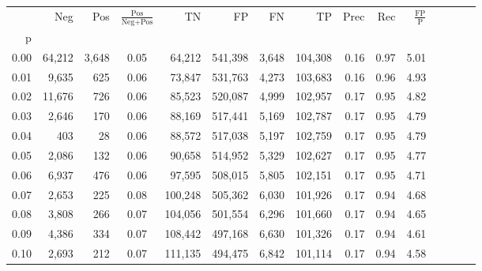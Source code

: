\begin{tabular}{rrrcrrrrrrrrrrr}
\toprule
{} &     Neg &     Pos & $\frac{\text{Pos}}{\text{Neg}+\text{Pos}}$ &       TN &       FP &       FN &       TP &  Prec &   Rec & $\frac{\text{FP}}{\text{P}}$ \\
p    &         &         &                                            &          &          &          &          &       &       &                              \\
\midrule
0.00 &  64,212 &   3,648 &                                       0.05 &   64,212 &  541,398 &    3,648 &  104,308 &  0.16 &  0.97 &                         5.01 \\
0.01 &   9,635 &     625 &                                       0.06 &   73,847 &  531,763 &    4,273 &  103,683 &  0.16 &  0.96 &                         4.93 \\
0.02 &  11,676 &     726 &                                       0.06 &   85,523 &  520,087 &    4,999 &  102,957 &  0.17 &  0.95 &                         4.82 \\
0.03 &   2,646 &     170 &                                       0.06 &   88,169 &  517,441 &    5,169 &  102,787 &  0.17 &  0.95 &                         4.79 \\
0.04 &     403 &      28 &                                       0.06 &   88,572 &  517,038 &    5,197 &  102,759 &  0.17 &  0.95 &                         4.79 \\
0.05 &   2,086 &     132 &                                       0.06 &   90,658 &  514,952 &    5,329 &  102,627 &  0.17 &  0.95 &                         4.77 \\
0.06 &   6,937 &     476 &                                       0.06 &   97,595 &  508,015 &    5,805 &  102,151 &  0.17 &  0.95 &                         4.71 \\
0.07 &   2,653 &     225 &                                       0.08 &  100,248 &  505,362 &    6,030 &  101,926 &  0.17 &  0.94 &                         4.68 \\
0.08 &   3,808 &     266 &                                       0.07 &  104,056 &  501,554 &    6,296 &  101,660 &  0.17 &  0.94 &                         4.65 \\
0.09 &   4,386 &     334 &                                       0.07 &  108,442 &  497,168 &    6,630 &  101,326 &  0.17 &  0.94 &                         4.61 \\
0.10 &   2,693 &     212 &                                       0.07 &  111,135 &  494,475 &    6,842 &  101,114 &  0.17 &  0.94 &                         4.58 \\

\end{tabular}
